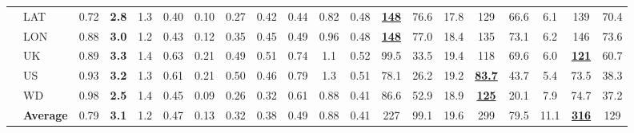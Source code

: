\begin{table}[t]
{\begin{tabular}{@{}c l | *{10}{c} | *{8}{c} @{}}
 & LAT & 0.72 & \textbf{2.8} & 1.3 & 0.40 & 0.10 & 0.27 & 0.42 & 0.44 & 0.82 & 0.48 & \underline{\textbf{148}} & 76.6 & 17.8 & 129 & 66.6 & 6.1 & 139 & 70.4 \\
 & LON & 0.88 & \textbf{3.0} & 1.2 & 0.43 & 0.12 & 0.35 & 0.45 & 0.49 & 0.96 & 0.48 & \underline{\textbf{148}} & 77.0 & 18.4 & 135 & 73.1 & 6.2 & 146 & 73.6 \\
 & UK & 0.89 & \textbf{3.3} & 1.4 & 0.63 & 0.21 & 0.49 & 0.51 & 0.74 & 1.1 & 0.52 & 99.5 & 33.5 & 19.4 & 118 & 69.6 & 6.0 & \underline{\textbf{121}} & 60.7 \\
 & US & 0.93 & \textbf{3.2} & 1.3 & 0.61 & 0.21 & 0.50 & 0.46 & 0.79 & 1.3 & 0.51 & 78.1 & 26.2 & 19.2 & \underline{\textbf{83.7}} & 43.7 & 5.4 & 73.5 & 38.3 \\
 & WD & 0.98 & \textbf{2.5} & 1.4 & 0.45 & 0.09 & 0.26 & 0.32 & 0.61 & 0.88 & 0.41 & 86.6 & 52.9 & 18.9 & \underline{\textbf{125}} & 20.1 & 7.9 & 74.7 & 37.2 \\
 & \textbf{Average} & 0.79 & \textbf{3.1} & 1.2 & 0.47 & 0.13 & 0.32 & 0.38 & 0.49 & 0.88 & 0.41 & 227 & 99.1 & 19.6 & 299 & 79.5 & 11.1 & \underline{\textbf{316}} & 129 \\
\bottomrule
\end{tabular}}
\end{table}
